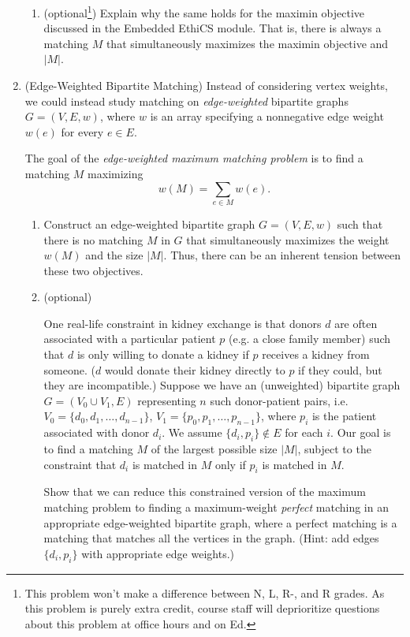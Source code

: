 \documentclass[11pt]{article}
\begin{document}
\begin{enumerate}
\begin{enumerate}
        \item (optional\footnote{This problem won't make a difference between N, L, R-, and R grades. As this problem is purely extra credit, course staff will deprioritize questions about this problem at office hours and on Ed.}) Explain why the same holds for the maximin objective discussed in the Embedded EthiCS module.  That is, there is always a matching $M$ that simultaneously maximizes the maximin objective and $|M|$. 
        \end{enumerate}
        

\item (Edge-Weighted Bipartite Matching) 
  Instead of considering vertex weights, we could instead study matching on
{\em edge-weighted} bipartite graphs $G = (V,E,w)$, where $w$ is an array specifying a nonnegative edge weight $w(e)$ for every $e\in E$.  

   The goal of the {\em edge-weighted maximum matching problem} is to find a matching $M$ maximizing $$w(M) = \sum_{e\in M} w(e).$$
   \begin{enumerate}
    \item Construct an edge-weighted bipartite graph $G = (V,E,w)$ such that there is no matching $M$ in $G$ that simultaneously maximizes the weight $w(M)$ and the size $|M|$.  Thus, there can be an inherent tension between these two objectives. 

    \item (optional\footnotemark[1])
  
    One real-life constraint in kidney exchange is that donors $d$ are often associated with a particular patient $p$ (e.g. a close family member) such that $d$ is only willing to donate a kidney if $p$ receives a kidney from someone.  ($d$ would donate their kidney directly to $p$ if they could, but they are incompatible.) 
    Suppose we have an (unweighted) bipartite graph $G=(V_0\cup V_1,E)$ representing $n$ such donor-patient pairs, i.e. $V_0=\{d_0,d_1,\ldots,d_{n-1}\}$, $V_1 = \{p_0,p_1,\ldots,p_{n-1}\}$, where $p_i$ is the patient associated with donor $d_i$. We assume $\{d_i,p_i\}\notin E$ for each $i$.   Our goal is to find a matching $M$ of the largest possible size $|M|$, subject to the constraint that $d_i$ is matched in $M$ only if $p_i$ is matched in $M$. 

    Show that we can reduce this constrained version of the maximum matching problem to finding a maximum-weight {\em perfect} matching in an appropriate edge-weighted bipartite graph, where
    a perfect matching is a matching that matches all the vertices in the graph. (Hint: add edges $\{d_i,p_i\}$ with appropriate edge weights.) 
    \end{enumerate}

\end{enumerate}
\end{document}
